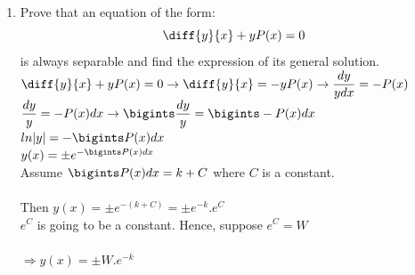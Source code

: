 \documentclass[fleqn]{article}
\begin{document}
\begin{enumerate}
    \item Prove that an equation of the form:
    $$
    \diff{y}{x} + y P(x) = 0
    $$
    is always separable and find the expression of its general solution. \\
      \textcolor{hwColor}{ 
        $
          \diff{y}{x}+yP(x)=0 \rightarrow \diff{y}{x}=-yP(x) \rightarrow \dfrac{dy}{ydx}=-P(x)
        $
        \\
        $\dfrac{dy}{y}=-P(x)dx \rightarrow \bigints \dfrac{dy}{y}=\bigints -P(x)dx$
        \\
        $ln|y|=-\bigints P(x)dx$
        \\
        $y(x)=\pm e^{-\bigints P(x)dx}$ \\
        Assume $\bigints P(x)dx=k+C$ where $C$ is a constant.  \\
        \\
        Then $y(x)=\pm e^{-(k+C)}=\pm e^{-k}.e^C$
        \\
        $e^C$ is going to be a constant. Hence, suppose $e^C=W$ \\
        \\
        $\Longrightarrow y(x)=\pm W.e^{-k}$    
      }


\end{enumerate}
\end{document}

